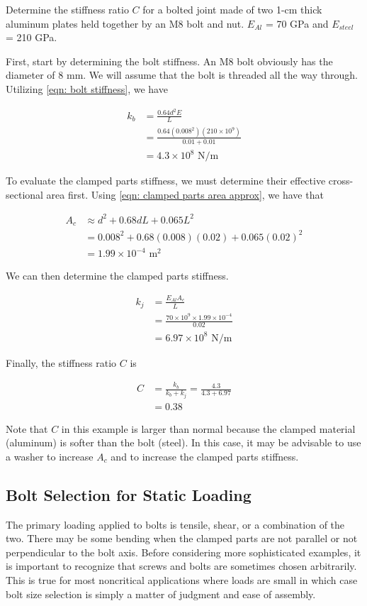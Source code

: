 \documentclass[a4paper,openany,nobib]{tufte-book}
\begin{document}
{{Determine the stiffness ratio \(C\) for a bolted joint made of two 1-cm
thick aluminum plates held together by an M8 bolt and nut. \(E_{Al}\) = 70
GPa and \(E_{steel}\) = 210 GPa.

First, start by determining the bolt stiffness. An M8 bolt obviously has
the diameter of 8 mm. We will assume that the bolt is threaded all the
way through. Utilizing \ref{eqn: bolt stiffness},
we have

$$\begin{aligned}
    k_b &= \frac{0.64d^2E}{L} \\
        &= \frac{0.64 (0.008^2)(210 \times 10^9)}{0.01+0.01} \\
        &= 4.3 \times 10^8 \text{ N/m}
  \end{aligned}$$

To evaluate the clamped parts stiffness, we must determine their
effective cross-sectional area first. Using
\ref{eqn: clamped parts area approx},
we have that

$$\begin{aligned}
    A_c &\approx d^2 + 0.68dL + 0.065L^2 \\
        &= 0.008^2 + 0.68(0.008)(0.02) + 0.065(0.02)^2 \\
        &= 1.99 \times 10^{-4} \text{ m}^2
  \end{aligned}$$

We can then determine the clamped parts stiffness.

$$\begin{aligned}
    k_j &= \frac{E_{Al}A_c}{L} \\
        &= \frac{70 \times 10^9 \times 1.99 \times 10^{-4}}{0.02} \\
        &= 6.97 \times 10^8 \text{ N/m}
  \end{aligned}$$

Finally, the stiffness ratio \(C\) is

$$\begin{aligned}
    C & = \frac{k_b}{k_b + k_j} = \frac{4.3}{4.3 + 6.97} \\
      &= 0.38
  \end{aligned}$$

Note that \(C\) in this example is larger than normal because the clamped
material (aluminum) is softer than the bolt (steel). In this case, it
may be advisable to use a washer to increase \(A_c\) and to increase the
clamped parts stiffness.

\subsection{Bolt Selection for Static Loading}
\label{bolt-selection-for-static-loading}
The primary loading applied to bolts is tensile, shear, or a combination
of the two. There may be some bending when the clamped parts are not
parallel or not perpendicular to the bolt axis. Before considering more
sophisticated examples, it is important to recognize that screws and
bolts are sometimes chosen arbitrarily. This is true for most
noncritical applications where loads are small in which case bolt size
selection is simply a matter of judgment and ease of assembly.

}}
\end{document}
